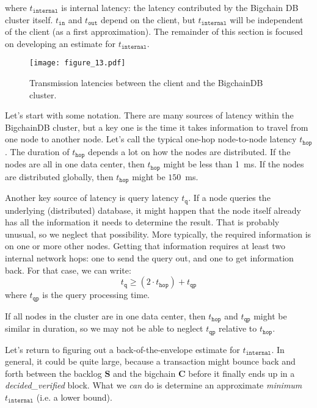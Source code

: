 where $t_{\mathtt{internal}}$ is internal latency: the latency contributed by the Bigchain DB cluster itself. 
$t_{\mathtt{in}}$ and $t_{\mathtt{out}}$ depend on the client, but $t_{\mathtt{internal}}$ will be independent of the client (as a first approximation). 
The remainder of this section is focused on developing an estimate for $t_{\mathtt{internal}}$.

\begin{figure}[!ht]
  \centering
  \texttt{[image: figure\_13.pdf]}
  \caption{Transmission latencies between the client and the BigchainDB cluster.}
  \label{fig:bigchaindb_tx_latency}
\end{figure}

Let’s start with some notation.
There are many sources of latency within the BigchainDB cluster, but a key one is the time it takes information to travel from one node to another node. 
Let’s call the typical one-hop node-to-node latency $t_{\mathtt{hop}}$. The duration of $t_{\mathtt{hop}}$ depends a lot on how the nodes are distributed. 
If the nodes are all in one data center, then $t_{\mathtt{hop}}$ might be less than 1~ms. If the nodes are distributed globally, then $t_{\mathtt{hop}}$ might be $150$~ms.

Another key source of latency is query latency $t_{\mathtt{q}}$. 
If a node queries the underlying (distributed) database, it might happen that the node itself already has all the information it needs to determine the result. 
That is probably unusual, so we neglect that possibility. More typically, the required information is on one or more other nodes. 
Getting that information requires at least two internal network hops: one to send the query out, and one to get information back. 
For that case, we can write:
\begin{equation}\label{eq:time_query}
t_\mathtt{q} \ge (2 \cdot t_\mathtt{hop}) + t_\mathtt{qp}
\end{equation}
where $t_\mathtt{qp}$ is the query processing time. 

If all nodes in the cluster are in one data center, then $t_\mathtt{hop}$ and $t_\mathtt{qp}$ might be similar in duration, so we may not be able to neglect $t_\mathtt{qp}$ relative to $t_\mathtt{hop}$.

Let’s return to figuring out a back-of-the-envelope estimate for $t_\mathtt{internal}$.
In general, it could be quite large, because a transaction might bounce back and forth between the backlog $\mathbf{S}$ and the bigchain $\mathbf{C}$ before it finally ends up in a \textsf{\textit{decided\_verified}} block.
What we \textit{can} do is determine an approximate \textit{minimum} $t_\mathtt{internal}$ (i.e. a lower bound).

